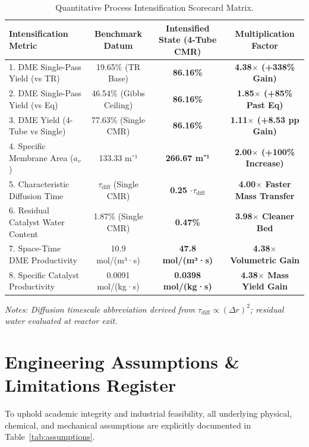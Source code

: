 \documentclass[12pt,a4paper]{article}
\begin{document}
\begin{table}[htbp]
\centering
\caption{Quantitative Process Intensification Scorecard Matrix.}
\label{tab:scorecard}
\begin{tabular*}{\textwidth}{@{\extracolsep{\fill}}lccc@{}}
\toprule
\textbf{Intensification Metric} & \textbf{Benchmark Datum} & \textbf{Intensified State (4-Tube CMR)} & \textbf{Multiplication Factor} \\
\midrule
1. DME Single-Pass Yield (vs TR) & 19.65\% (TR Base) & \textbf{86.16\%} & \textbf{4.38$\times$ (+338\% Gain)} \\
2. DME Single-Pass Yield (vs Eq) & 46.54\% (Gibbs Ceiling) & \textbf{86.16\%} & \textbf{1.85$\times$ (+85\% Past Eq)} \\
3. DME Yield (4-Tube vs Single) & 77.63\% (Single CMR) & \textbf{86.16\%} & \textbf{1.11$\times$ (+8.53 pp Gain)} \\
4. Specific Membrane Area ($a_v$) & 133.33 m⁻¹ & \textbf{266.67 m⁻¹} & \textbf{2.00$\times$ (+100\% Increase)} \\
5. Characteristic Diffusion Time & $\tau_{\text{diff}}$ (Single CMR) & \textbf{0.25 $\cdot \tau_{\text{diff}}$} & \textbf{4.00$\times$ Faster Mass Transfer} \\
6. Residual Catalyst Water Content & 1.87\% (Single CMR) & \textbf{0.47\%} & \textbf{3.98$\times$ Cleaner Bed} \\
7. Space-Time DME Productivity & 10.9 mol/(m³·s) & \textbf{47.8 mol/(m³·s)} & \textbf{4.38$\times$ Volumetric Gain} \\
8. Specific Catalyst Productivity & 0.0091 mol/(kg·s) & \textbf{0.0398 mol/(kg·s)} & \textbf{4.38$\times$ Mass Yield Gain} \\
\bottomrule
\end{tabular*}
\vspace{2pt}
{\raggedright\small\itshape Notes: Diffusion timescale abbreviation derived from $\tau_{\text{diff}} \propto (\Delta r)^2$; residual water evaluated at reactor exit.\par}
\end{table}

\section{Engineering Assumptions \& Limitations Register}
To uphold academic integrity and industrial feasibility, all underlying physical, chemical, and mechanical assumptions are explicitly documented in Table~\ref{tab:assumptions}.
\end{document}

